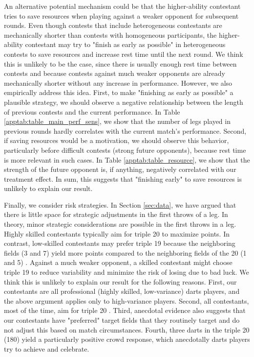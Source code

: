 \documentclass[11pt,a4paper]{article}
\begin{document}
An alternative potential mechanism could be that the higher-ability contestant tries to save resources when playing against a weaker opponent for subsequent rounds. Even though contests that include heterogeneous contestants are mechanically shorter than contests with homogeneous participants, the higher-ability contestant may try to "finish as early as possible" in heterogeneous contests to save resources and increase rest time until the next round. We think this is unlikely to be the case, since there is usually enough rest time between contests and because contests against much weaker opponents are already mechanically shorter without any increase in performance. However, we also empirically address this idea. First, to make "finishing as early as possible" a plausible strategy, we should observe a negative relationship between the length of previous contests and the current performance. In Table \ref{apptab:table_main_perf_sens}, we show that the number of legs played in previous rounds hardly correlates with the current match's performance. Second, if saving resources would be a motivation, we should observe this behavior, particularly before difficult contests (strong future opponents), because rest time is more relevant in such cases. In Table \ref{apptab:table_resource}, we show that the strength of the future opponent is, if anything, negatively correlated with our treatment effect. In sum, this suggests that "finishing early" to save resources is unlikely to explain our result.\par 

Finally, we consider risk strategies. In Section \ref{sec:data}, we have argued that there is little space for strategic adjustments in the first throws of a leg. In theory, minor strategic considerations are possible in the first throws in a leg. Highly skilled contestants typically aim for triple 20 to maximize points. In contrast, low-skilled contestants may prefer triple 19 because the neighboring fields (3 and 7) yield more points compared to the neighboring fields of the 20 (1 and 5) \cite{Tibshirani.2011}. Against a much weaker opponent, a skilled contestant might choose triple 19 to reduce variability and minimize the risk of losing due to bad luck. We think this is unlikely to explain our result for the following reasons. First, our contestants are all professional (highly skilled, low-variance) darts players, and the above argument applies only to high-variance players. Second, all contestants, most of the time, aim for triple 20 \cite{Klein.2020}. Third, anecdotal evidence also suggests that our contestants have "preferred" target fields that they routinely target and do not adjust this based on match circumstances. Fourth, three darts in the triple 20 (180) yield a particularly positive crowd response, which anecdotally darts players try to achieve and celebrate.
\end{document}
